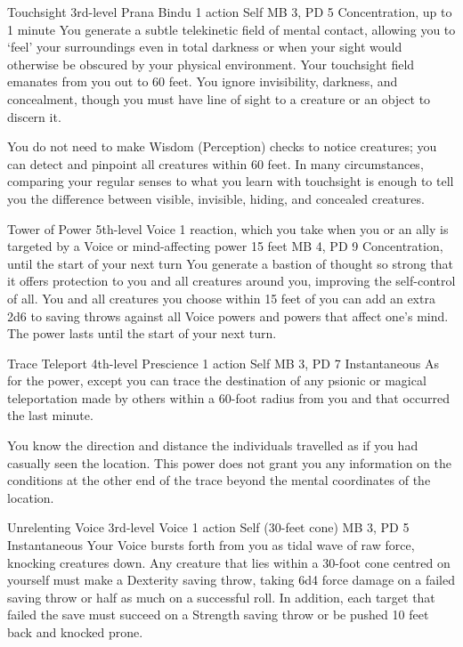 \DndPowerHeader%
  {Touchsight}
  {3rd-level Prana Bindu}
  {1 action}
  {Self}
  {MB 3, PD 5}
  {Concentration, up to 1 minute}
  You generate a subtle telekinetic field of mental contact,
  allowing you to `feel' your surroundings even in total darkness
  or when your sight would otherwise be obscured
  by your physical environment.
  Your touchsight field emanates from you out to 60 feet.
  You ignore invisibility, darkness, and concealment,
  though you must have line of sight to a creature or an object
  to discern it.
  
  You do not need to make Wisdom (Perception) checks
  to notice creatures; you can detect and pinpoint all creatures
  within 60 feet.
  In many circumstances, comparing your regular senses
  to what you learn with touchsight is enough to tell you
  the difference between visible, invisible, hiding,
  and concealed creatures.

\DndPowerHeader%
  {Tower of Power}
  {5th-level Voice}
  {1 reaction, which you take when you or an ally is
    targeted by a Voice or mind-affecting power}
  {15 feet}
  {MB 4, PD 9}
  {Concentration, until the start of your next turn}
  You generate a bastion of thought so strong
  that it offers protection to you and all creatures around you,
  improving the self-control of all.
  You and all creatures you choose within 15 feet of you
  can add an extra 2d6 to saving throws against all Voice powers
  and powers that affect one's mind.
  The power lasts until the start of your next turn.

\DndPowerHeader%
  {Trace Teleport}
  {4th-level Prescience}
  {1 action}
  {Self}
  {MB 3, PD 7}
  {Instantaneous}
  As for the  power,
  except you can trace the destination of any psionic
  or magical teleportation made by others within
  a 60-foot radius from you
  and that occurred the last minute.

  You know the direction and distance the individuals travelled
  as if you had casually seen the location.
  This power does not grant you any information on the conditions
  at the other end of the trace
  beyond the mental coordinates of the location.

\DndPowerHeader%
  {Unrelenting Voice}
  {3rd-level Voice}
  {1 action}
  {Self (30-feet cone)}
  {MB 3, PD 5}
  {Instantaneous}
Your Voice bursts forth from you as tidal wave of raw force,
knocking creatures down.
Any creature that lies within a 30-foot cone centred on yourself
must make a Dexterity saving throw,
taking 6d4 force damage on a failed saving throw or half as much on
a successful roll.
In addition, each target that failed the save
must succeed on a Strength saving throw or be pushed 10 feet back
and knocked prone.

